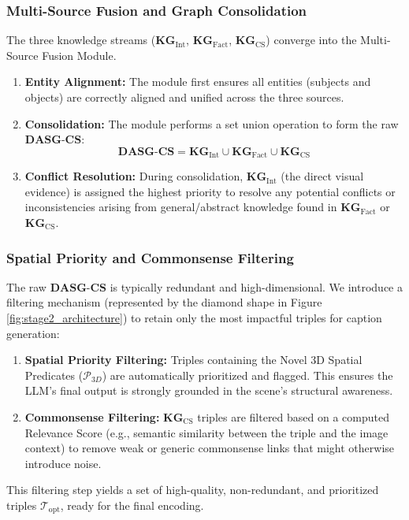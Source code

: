 \documentclass[runningheads,14pt]{llncs}
\begin{document}
\subsubsection{Multi-Source Fusion and Graph Consolidation}
The three knowledge streams ($\mathbf{KG}_{\text{Int}}$, $\mathbf{KG}_{\text{Fact}}$, $\mathbf{KG}_{\text{CS}}$) converge into the Multi-Source Fusion Module.

\begin{enumerate}
    \item \textbf{Entity Alignment:} The module first ensures all entities (subjects and objects) are correctly aligned and unified across the three sources.
    \item \textbf{Consolidation:} The module performs a set union operation to form the raw $\mathbf{DASG\text{-}CS}$:
    $$\mathbf{DASG\text{-}CS} = \mathbf{KG}_{\text{Int}} \cup \mathbf{KG}_{\text{Fact}} \cup \mathbf{KG}_{\text{CS}}$$
    \item \textbf{Conflict Resolution:} During consolidation, $\mathbf{KG}_{\text{Int}}$ (the direct visual evidence) is assigned the highest priority to resolve any potential conflicts or inconsistencies arising from general/abstract knowledge found in $\mathbf{KG}_{\text{Fact}}$ or $\mathbf{KG}_{\text{CS}}$.
\end{enumerate}

\subsubsection{Spatial Priority and Commonsense Filtering}
The raw $\mathbf{DASG\text{-}CS}$ is typically redundant and high-dimensional. We introduce a filtering mechanism (represented by the diamond shape in Figure \ref{fig:stage2_architecture}) to retain only the most impactful triples for caption generation:

\begin{enumerate}
    \item \textbf{Spatial Priority Filtering:} Triples containing the Novel 3D Spatial Predicates ($\mathcal{P}_{3D}$) are automatically prioritized and flagged. This ensures the LLM's final output is strongly grounded in the scene's structural awareness.
    \item \textbf{Commonsense Filtering:} $\mathbf{KG}_{\text{CS}}$ triples are filtered based on a computed Relevance Score (e.g., semantic similarity between the triple and the image context) to remove weak or generic commonsense links that might otherwise introduce noise.
\end{enumerate}
This filtering step yields a set of high-quality, non-redundant, and prioritized triples $\mathcal{T}_{\text{opt}}$, ready for the final encoding.
\end{document}
